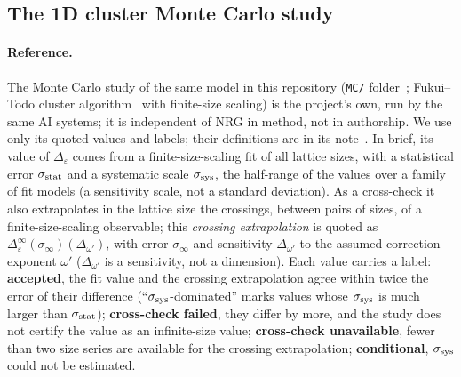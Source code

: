 \documentclass[10pt,a4paper]{article}
\newcommand{\De}{\Delta_\varepsilon}
\newcommand{\code}[1]{\texttt{#1}}
\begin{document}
\subsection{The 1D cluster Monte Carlo study}\label{sec:mc}
\paragraph{Reference.} The Monte Carlo study of the same model in this repository (\code{MC/} folder~\cite{MCnote}; Fukui--Todo
cluster algorithm~\cite{FukuiTodo2009,LB95} with finite-size scaling) is the project's own, run by the same AI systems; it is
independent of NRG in method, not in authorship. We use only its quoted values and labels; their definitions are in its
note~\cite{MCnote}. In brief, its value of $\De$ comes from a finite-size-scaling fit of all lattice sizes, with a statistical error
$\sigma_{\rm stat}$ and a systematic scale $\sigma_{\rm sys}$, the half-range of the values over a family of fit models (a sensitivity
scale, not a standard deviation). As a cross-check it also extrapolates in the lattice size the crossings, between pairs of sizes, of a
finite-size-scaling observable; this \emph{crossing extrapolation} is quoted as $\De^\infty(\sigma_\infty)(\Delta_{\omega'})$, with
error $\sigma_\infty$ and sensitivity $\Delta_{\omega'}$ to the assumed correction exponent $\omega'$ ($\Delta_{\omega'}$ is a
sensitivity, not a dimension). Each value carries a label: \textbf{accepted}, the fit value and the crossing extrapolation agree within
twice the error of their difference (``$\sigma_{\rm sys}$-dominated'' marks values whose $\sigma_{\rm sys}$ is much larger than
$\sigma_{\rm stat}$); \textbf{cross-check failed}, they differ by more, and the study does not certify the value as an infinite-size
value; \textbf{cross-check unavailable}, fewer than two size series are available for the crossing extrapolation; \textbf{conditional},
$\sigma_{\rm sys}$ could not be estimated.
\end{document}
